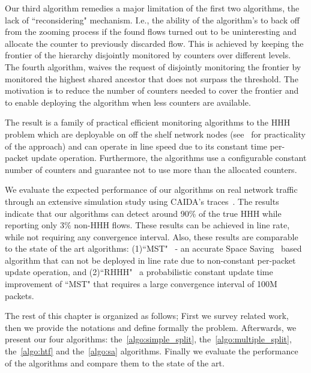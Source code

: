 Our third algorithm remedies a major limitation of the first two algorithms, the lack of ``reconsidering" mechanism. I.e., the ability of the algorithm's to back off from the zooming process if the found flows turned out to be uninteresting and allocate the counter to previously discarded flow. This is achieved by keeping the frontier of the hierarchy disjointly monitored by counters over different levels.
The fourth algorithm, waives the request of disjointly monitoring the frontier by monitored the highest shared ancestor that does not surpass the threshold. The motivation is to reduce the number of counters needed to cover the frontier and to enable deploying the algorithm when less counters are available.

The result is a family of practical efficient monitoring algorithms to the HHH problem which are deployable on off the shelf network nodes (see~\cite{Moraney2016} for practicality of the approach) and can operate in line speed due to its constant time per-packet update operation. Furthermore, the algorithms use a configurable constant number of counters and guarantee not to use more than the allocated counters.

We evaluate the expected performance of our algorithms on real network traffic through an extensive simulation study using CAIDA’s traces~\cite{CAIDA2016, CAIDA2018}.
The results indicate that our algorithms can detect around 90\% of the true HHH while reporting only 3\% non-HHH flows. These results can be achieved in line rate, while not requiring any convergence interval. Also, these results are comparable to the state of the art algorithms: (1)``MST"~\cite{SpaceSaving} - an accurate Space Saving~\cite{Metwally2005} based algorithm that can not be deployed in line rate due to non-constant per-packet update operation, and (2)``RHHH"~\cite{ben2017constant} a probabilistic constant update time improvement of ``MST" that requires a large convergence interval of 100M packets.

The rest of this chapter is organized as follows; First we survey related work, then we provide the notations and define formally the problem. Afterwards, we present our four algorithms: the~\ref{algo:simple_split}, the~\ref{algo:multiple_split}, the~\ref{algo:htf} and the~\ref{algo:sa} algorithms. Finally we evaluate the performance of the algorithms and compare them to the state of the art.
